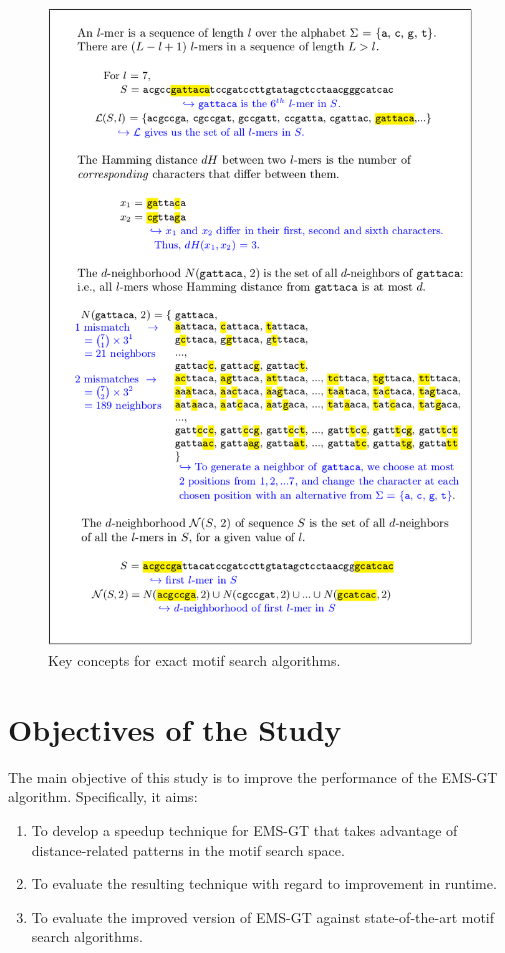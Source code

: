 \documentclass[oneside,12pt]{DISCSthesis}
\begin{document}
	\begin{figure}[hp]
		\centering
		\includegraphics[width=5.1in]{img/concepts}
		\caption{Key concepts for exact motif search algorithms.}
		\end{figure}
	\newpage

	\section{Objectives of the Study}
		The main objective of this study is to improve the performance of the EMS-GT algorithm. Specifically, it aims:
		\begin{enumerate}
		\item To develop a speedup technique for EMS-GT that takes advantage of distance-related patterns in the motif search space.
		\item To evaluate the resulting technique with regard to improvement in runtime. %
		\item To evaluate the improved version of EMS-GT against state-of-the-art motif search algorithms.
		\end{enumerate}
\end{document}
